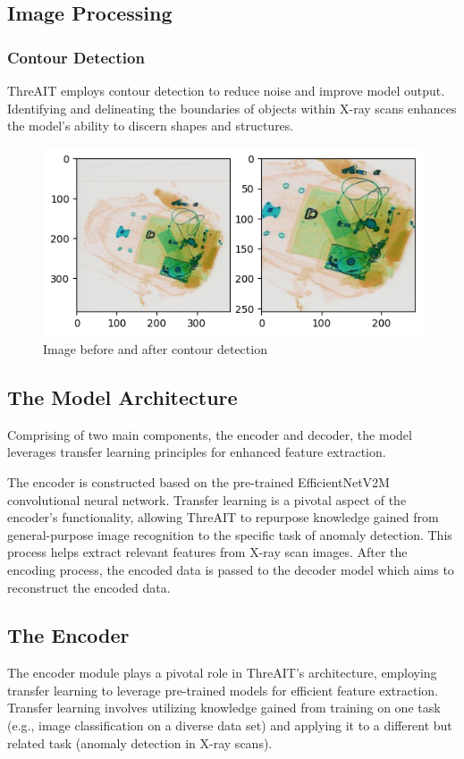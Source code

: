 \documentclass{article}
\begin{document}
\subsection{Image Processing}
\subsubsection{Contour Detection}
 
ThreAIT employs contour detection to reduce noise and improve model output. Identifying and delineating the boundaries of objects within X-ray scans enhances the model's ability to discern shapes and structures.

\begin{figure}[h!]
    \centering
    \includegraphics[width=1\linewidth]{img/contour.png}
    \caption{Image before and after contour detection}
    \label{fig:contour-before-after}
\end{figure}

\subsection{The Model Architecture}
Comprising of two main components, the encoder and decoder, the model leverages transfer learning principles for enhanced feature extraction.

The encoder is constructed based on the pre-trained EfficientNetV2M convolutional neural network. Transfer learning is a pivotal aspect of the encoder's functionality, allowing ThreAIT to repurpose knowledge gained from general-purpose image recognition to the specific task of anomaly detection. This process helps extract relevant features from X-ray scan images. After the encoding process, the encoded data is passed to the decoder model which aims to reconstruct the encoded data. 

\subsection{The Encoder}
The encoder module plays a pivotal role in ThreAIT's architecture, employing transfer learning to leverage pre-trained models for efficient feature extraction. Transfer learning involves utilizing knowledge gained from training on one task (e.g., image classification on a diverse data set) and applying it to a different but related task (anomaly detection in X-ray scans).
\end{document}

